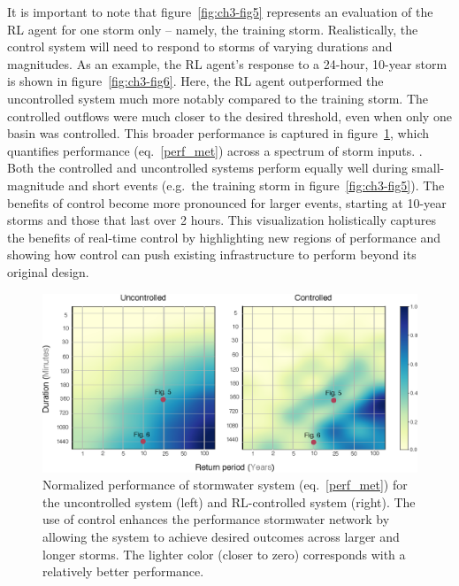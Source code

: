 It is important to note that figure~\ref{fig:ch3-fig5} represents an evaluation of the RL agent for one storm only – namely, the training storm.
Realistically, the control system will need to respond to storms of varying durations and magnitudes.
As an example, the RL agent’s response to a 24-hour, 10-year storm is shown in figure~\ref{fig:ch3-fig6}.
Here, the RL agent outperformed the uncontrolled system much more notably compared to the training storm.
The controlled outflows were much closer to the desired threshold, even when only one basin was controlled.
This broader performance is captured in figure~\ref{fig:ch3-fig7}, which quantifies performance (eq.~\ref{perf_met}) across a spectrum of storm inputs.
.
Both the controlled  and uncontrolled systems perform equally well during small-magnitude and short events (e.g.\ the training storm in figure~\ref{fig:ch3-fig5}).
The benefits of control become more pronounced for larger events, starting at 10-year storms and those that last over 2 hours.
This visualization holistically captures the benefits of real-time control by highlighting new regions of performance and showing how control can push existing infrastructure to perform beyond its original design.

\begin{figure}
    \centering
    \includegraphics[width=\linewidth]{gfx/Chapter-3/heatmap.eps}
    \caption{Normalized performance of stormwater system (eq.~\ref{perf_met}) for the uncontrolled system (left) and RL-controlled system (right). The use of control enhances the performance stormwater network by allowing the system to achieve desired outcomes across larger and longer storms. The lighter color (closer to zero) corresponds with a relatively better performance.}\label{fig:ch3-fig7}
\end{figure}


